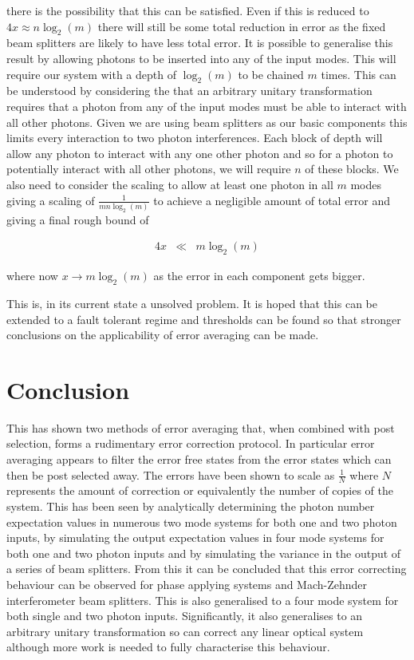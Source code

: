 \documentclass[aps,pra,twocolumn,superscriptaddress,numerical]{revtex4-1}
\begin{document}
		
		there is the possibility that this can be satisfied. Even if this is reduced to $4x\approx n\log_{2}\left(m\right)$ there will still be some total reduction in error as the fixed beam splitters are likely to have less total error. It is possible to generalise this result by allowing photons to be inserted into any of the input modes. This	will require our system with a depth of $\log_{2}\left(m\right)$ to be chained $m$  times. This can be understood by considering the that an arbitrary unitary transformation requires that a photon from any of the  input modes must be able to interact with all other photons. Given we are using beam splitters as our basic components this limits every interaction to two photon interferences. Each block of depth  will allow any photon to interact with any one other photon and so for a photon to potentially interact with all other photons, we will require $n$ of these blocks. We also need to consider the scaling to allow at least one photon in all $m$ modes giving a scaling of $\frac{1}{mn\log_{2}\left(m\right)}$ to achieve a negligible amount of total error and giving a final rough bound of
			
		\begin{eqnarray}
			4x & \ll & m\log_{2}\left(m\right)\label{eq:aDifferentInequality}
		\end{eqnarray}
		
		
		where now $x\rightarrow m\log_{2}\left(m\right)$ as the error in each component gets bigger.
		
		This is, in its current state a unsolved problem. It is hoped that this can be extended to a fault tolerant regime and thresholds can be found so that stronger conclusions on the applicability of error averaging can be made.

\section{Conclusion\label{Conclusion}}
	This has shown two methods of error averaging that, when combined with post selection, forms a rudimentary error correction protocol. In particular error averaging appears to filter the error free states from the error states which can then be post selected away. The errors have been shown to scale as $\frac{1}{N}$ where $N$ represents the amount of correction or equivalently the number of copies of the system. This has been seen by analytically determining the photon number expectation values in numerous two mode systems for both one and two photon inputs, by simulating the output expectation values in four mode systems for both one and two photon inputs and by simulating the variance in the output of a series of beam splitters. From this it can be concluded that this error correcting behaviour can be observed for phase applying systems and Mach-Zehnder interferometer beam splitters. This is also generalised to a four mode system for both single and two photon inputs. Significantly, it also generalises to an arbitrary unitary transformation so can correct any linear optical system although more work is needed to fully characterise this behaviour.
	
\end{document}
